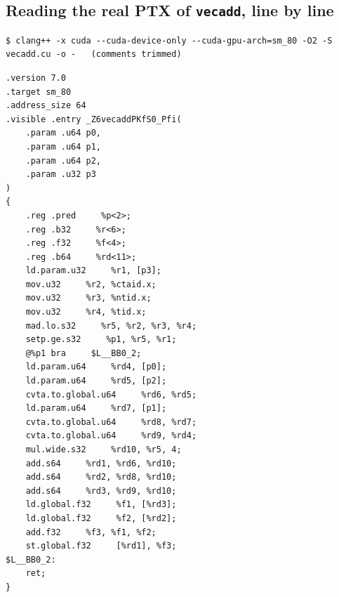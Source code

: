\documentclass[10pt,a4paper,openany,oneside]{report}
\begin{document}
\subsection{Reading the real PTX of \texttt{vecadd}, line by line}
\begin{lstlisting}[style=shcmd]
$ clang++ -x cuda --cuda-device-only --cuda-gpu-arch=sm_80 -O2 -S vecadd.cu -o -   (comments trimmed)
\end{lstlisting}
\begin{lstlisting}[language={PTX},style=out]
.version 7.0
.target sm_80
.address_size 64
.visible .entry _Z6vecaddPKfS0_Pfi(
    .param .u64 p0,
    .param .u64 p1,
    .param .u64 p2,
    .param .u32 p3
)
{
    .reg .pred     %p<2>;
    .reg .b32     %r<6>;
    .reg .f32     %f<4>;
    .reg .b64     %rd<11>;
    ld.param.u32     %r1, [p3];
    mov.u32     %r2, %ctaid.x;
    mov.u32     %r3, %ntid.x;
    mov.u32     %r4, %tid.x;
    mad.lo.s32     %r5, %r2, %r3, %r4;
    setp.ge.s32     %p1, %r5, %r1;
    @%p1 bra     $L__BB0_2;
    ld.param.u64     %rd4, [p0];
    ld.param.u64     %rd5, [p2];
    cvta.to.global.u64     %rd6, %rd5;
    ld.param.u64     %rd7, [p1];
    cvta.to.global.u64     %rd8, %rd7;
    cvta.to.global.u64     %rd9, %rd4;
    mul.wide.s32     %rd10, %r5, 4;
    add.s64     %rd1, %rd6, %rd10;
    add.s64     %rd2, %rd8, %rd10;
    add.s64     %rd3, %rd9, %rd10;
    ld.global.f32     %f1, [%rd3];
    ld.global.f32     %f2, [%rd2];
    add.f32     %f3, %f1, %f2;
    st.global.f32     [%rd1], %f3;
$L__BB0_2:
    ret;
}
\end{lstlisting}
\end{document}
